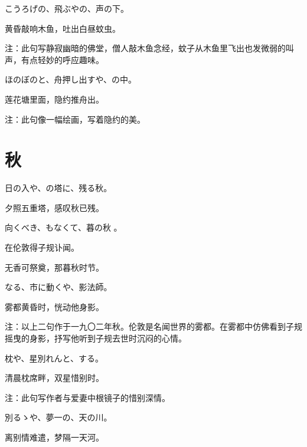 \begin{haiku}
    {\FH こうろげの、飛ぶやの、声の下。}

    {\FK 黄昏敲响木鱼，吐出白昼蚊虫。}

    {\FT 注：此句写静寂幽暗的佛堂，僧人敲木鱼念经，蚊子从木鱼里飞出也发微弱的叫声，有点轻妙的呼应趣味。}
\end{haiku}

\begin{haiku}
    {\FH ほのぼのと、舟押し出すや、の中。}

    {\FK 莲花塘里面，隐约推舟出。}

    {\FT 注：此句像一幅绘画，写着隐约的美。}
\end{haiku}

\section{\FK 秋}

\setcounter{haikucounter}{0}

\begin{haiku}
    {\FH 日の入や、の塔に、残る秋。}

    {\FK 夕照五重塔，感叹秋已残。}
\end{haiku}

\begin{haiku}
    {\FH {}向くべき、もなくて、暮の秋
。}

{\FK 在伦敦得子规讣闻。}

{\FK 无香可祭奠，那暮秋时节。}
\end{haiku}

\begin{haiku}
    {\FH {}なる、市に動くや、影法師。}

    {\FK 雾都黄昏时，恍动他身影。}

    {\FT 注：以上二句作于一九〇二年秋。伦敦是名闻世界的雾都。在雾都中仿佛看到子规摇曳的身影，抒写他听到子规去世时沉闷的心情。}
\end{haiku}

\begin{haiku}
    {\FH 枕や、星別れんと、する。}

    {\FK 清晨枕席畔，双星惜别时。}

    {\FT 注：此句写作者与爱妻中根镜子的惜别深情。}
\end{haiku}

\begin{haiku}
    {\FH 別るゝや、夢一の、天の川。}

    {\FK 离别情难遣，梦隔一天河。}
\end{haiku}

